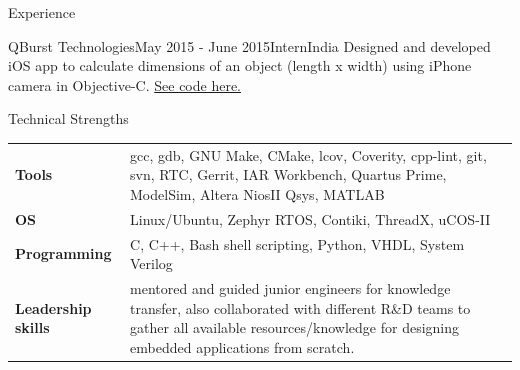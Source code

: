 \documentclass[
	a4paper, %
	11pt, %
]{resume} %
\begin{document}
\begin{rSection}{Experience}
	\begin{rSubsection}{QBurst Technologies}{May 2015 - June 2015}{Intern}{India}
            Designed and developed iOS app to calculate dimensions of an object (length x width) using iPhone camera in Objective-C.
            \href{https://github.com/sebinsphilip/The\_Dimension\_Tool} {See code here.}

	\end{rSubsection}
 
\end{rSection}


\begin{rSection}{Technical Strengths}

	\begin{tabular}[t]{m{3cm} m{14cm}}
		\textbf{Tools} & gcc, gdb, GNU Make, CMake, lcov, Coverity, cpp-lint, git, svn, RTC, Gerrit, IAR
Workbench, Quartus Prime, ModelSim, Altera NiosII Qsys, MATLAB \\
            \textbf{OS} & Linux/Ubuntu, Zephyr RTOS, Contiki, ThreadX, uCOS-II \\
            \textbf{Programming} & C, C++, Bash shell scripting, Python, VHDL, System Verilog \\
		\textbf{Leadership skills} & mentored and guided junior engineers for knowledge transfer, also collaborated with different R\&D teams to gather all available resources/knowledge for designing embedded applications from scratch.

	\end{tabular}
 
\end{rSection}

\end{document}
